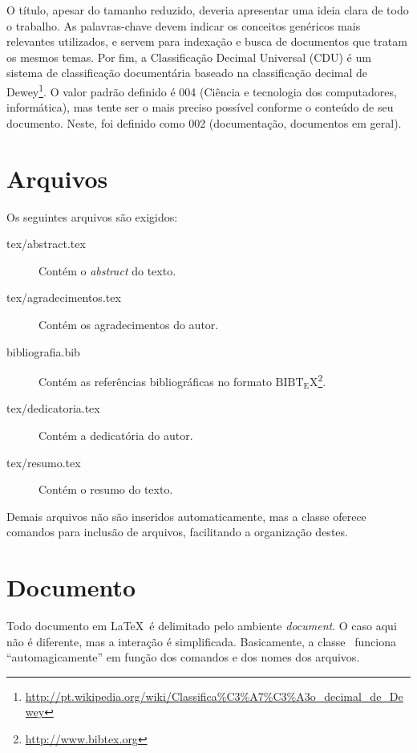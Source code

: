 O título, apesar do tamanho reduzido, deveria apresentar uma ideia clara de todo
o trabalho. As palavras-chave devem indicar os conceitos genéricos mais relevantes
utilizados, e servem para indexação e busca de documentos que tratam os mesmos 
temas.  Por fim, a Classificação Decimal Universal (CDU) é um sistema de classificação 
documentária baseado na classificação decimal de Dewey\footnote{\url{http://pt.wikipedia.org/wiki/Classifica\%C3\%A7\%C3\%A3o_decimal_de_Dewey}}.
O valor padrão definido é 004 (Ciência e tecnologia dos computadores, informática), 
mas tente ser o mais preciso possível conforme o conteúdo de seu documento. Neste,
foi definido como 002 (documentação, documentos em geral).


\section{Arquivos}
Os seguintes arquivos são exigidos:
\begin{description}%
    \item[tex/abstract.tex] Contém o \emph{abstract} do texto.%
    \item[tex/agradecimentos.tex] Contém os agradecimentos do autor.%
    \item[bibliografia.bib] Contém as referências bibliográficas no formato 
    ${\mathrm{B{\scriptstyle{IB}}T_{\displaystyle E}X}}$\footnote{\url{http://www.bibtex.org}}.%
    \item[tex/dedicatoria.tex] Contém a dedicatória do autor.%
    \item[tex/resumo.tex] Contém o resumo do texto.%
\end{description}%

Demais arquivos não são inseridos automaticamente, mas a classe oferece comandos 
para inclusão de arquivos, facilitando a organização destes.



\section{Documento}
Todo documento em \LaTeX\ é delimitado pelo ambiente \emph{document}. O caso aqui 
não é diferente, mas a interação é simplificada. Basicamente, a classe \unbcic\ 
funciona ``automagicamente'' em função dos comandos e dos nomes dos arquivos. 


